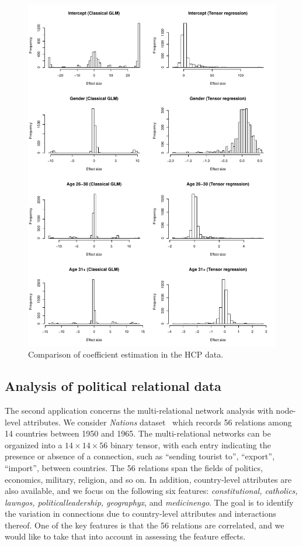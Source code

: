 \documentclass[12pt]{article}
\theoremstyle{plain}
\theoremstyle{definition}
\begin{document}
\begin{figure}[H]
\centering
\includegraphics[width=16cm]{compare.pdf}
\caption{Comparison of coefficient estimation in the HCP data.}\label{fig:s1}
\end{figure}

\subsection{Analysis of political relational data}

The second application concerns the multi-relational network analysis with node-level attributes. We consider \emph{Nations} dataset~\citep{nickel2011three} which records 56 relations among 14 countries between 1950 and 1965. The multi-relational networks can be organized into a $14 \times 14 \times 56$ binary tensor, with each entry indicating the presence or absence of a connection, such as ``sending tourist to'', ``export'', ``import'', between countries. The 56 relations span the fields of politics, economics, military, religion, and so on. In addition, country-level attributes are also available, and we focus on the following six features: \emph{constitutional, catholics, lawngos, politicalleadership, geographyx}, and \emph{medicinengo}. The goal is to identify the variation in connections due to country-level attributes and interactions thereof. One of the key features is that the 56 relations are correlated, and we would like to take that into account in assessing the feature effects. 
\end{document}
